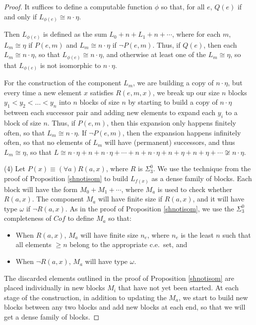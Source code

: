 \documentclass[10pt,a4paper]{amsart}
\begin{document}
\begin{proof}
It suffices to define a computable function $\phi$ so that, for all $e$, $Q(e)$ if and only if $L_{\phi(e)} \cong n \cdot \eta$.

Then $L_{\phi(e)}$ is defined as the sum $L_0 + n + L_1 + n +  \dotsb$, where for each $m$, $L_m \cong \eta$ if $P(e,m)$ and $L_m \cong n\cdot \eta$ if $\neg P(e,m)$. Thus, if $Q(e)$, then each $L_m \cong n \cdot \eta$, so that $L_{\phi(e)} \cong n \cdot \eta$, and otherwise at least one of the $L_m \cong \eta$, so that $L_{\phi(e)}$ is not isomorphic to $n \cdot \eta$. 

For the construction of the component $L_m$, we are building a copy of $n \cdot \eta$, but every time a new element $x$ satisfies $R(e,m,x)$, we break up our size $n$ blocks $y_1 < y_2 < \dots < y_n$ into $n$ blocks of size $n$ by starting to build a copy of $n \cdot \eta$ between each successor pair and adding new elements to expand each $y_i$ to a block of size $n$. Thus, if $P(e,m)$, then this expansion only happens finitely often, so that $L_m \cong n \cdot \eta$. 
If $\neg P(e,m)$, then the expansion happens infinitely often, so that no elements of $L_m$ will have (permanent) successors, and thus $L_m \cong \eta$, so that $L \cong n \cdot \eta + n + n \cdot \eta + \dotsb + n + n \cdot \eta + n + \eta + n + \eta + \cdots\not\cong n\cdot\eta$. 


\medskip

(4) Let $P(x) \equiv (\forall a)R(a,x)$, where $R$ is $\Sigma^0_3$. We use the technique from the proof of Proposition \ref{shnotisom} to build $L_{f(x)}$ as a dense family of blocks. Each block will have the form $M_0 + M_1 + \cdots$, where $M_a$ is used to check whether $R(a,x)$. The component $M_a$ will have finite size if $R(a,x)$, and it will have type $\omega$ if $\neg R(a,x)$. As in the proof of Proposition \ref{shnotisom}, we use the $\Sigma^0_3$ completeness of $Cof$ to define $M_a$ so that:

\begin{itemize}
\item 
 When $R(a,x)$, $M_a$ will have finite size $n_e$, where $n_e$ is the least $n$ such that all elements $\geq n$ belong to the appropriate c.e.\ set, and 

\item When $\neg R(a,x)$, $M_a$ will have type $\omega$. 
\end{itemize}

The discarded elements outlined in the proof of Proposition \ref{shnotisom} are placed individually in new blocks $M_i$ that have not yet been started. At each stage of the construction, in addition to updating the $M_a$, we start to build new blocks between any two blocks and add new blocks at each end, so that we will get a dense family of blocks. 


\end{proof}
\end{document}
